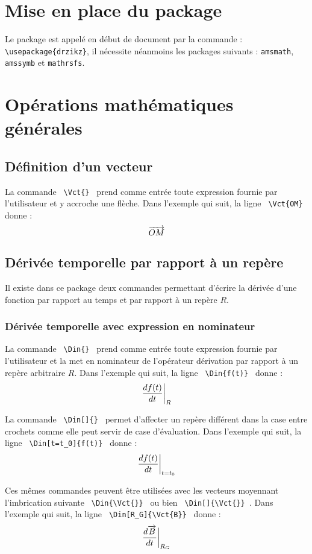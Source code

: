 \documentclass[12pt]{article}
\begin{document}
\section{Mise en place du package}

Le package est appelé en début de document par la commande : \verb|\usepackage{drzikz}|, il nécessite néanmoins les packages suivants : \verb|amsmath|, \verb|amssymb| et \verb|mathrsfs|.

\newpage

\section{Opérations mathématiques générales}

\subsection{Définition d'un vecteur}
La commande \verb| \Vct{} | prend comme entrée toute expression fournie par l'utilisateur et y accroche une flèche. Dans l'exemple qui suit, la ligne  \verb| \Vct{OM} | donne : $$ \Vct{OM} $$

\subsection{Dérivée temporelle par rapport à un repère}
Il existe dans ce package deux commandes permettant d'écrire la dérivée d'une fonction par rapport au temps et par rapport à un repère $R$.

\subsubsection{Dérivée temporelle avec expression en nominateur}
La commande \verb| \Din{} | prend comme entrée toute expression fournie par l'utilisateur et la met en nominateur de l'opérateur dérivation par rapport à un repère arbitraire $R$. Dans l'exemple qui suit, la ligne  \verb| \Din{f(t)} | donne : $$ \Din{f(t)} $$

La commande \verb| \Din[]{} | permet d'affecter un repère différent dans la case entre crochets comme elle peut servir de case d'évaluation. Dans l'exemple qui suit, la ligne  \verb| \Din[t=t_0]{f(t)} | donne : $$ \Din[t=t_0]{f(t)} $$

Ces mêmes commandes peuvent être utilisées avec les vecteurs moyennant l'imbrication suivante \verb| \Din{\Vct{}} | ou bien \verb| \Din[]{\Vct{}} |. Dans l'exemple qui suit, la ligne  \verb| \Din[R_G]{\Vct{B}} | donne : $$ \Din[R_G]{\Vct{B}} $$
\end{document}
